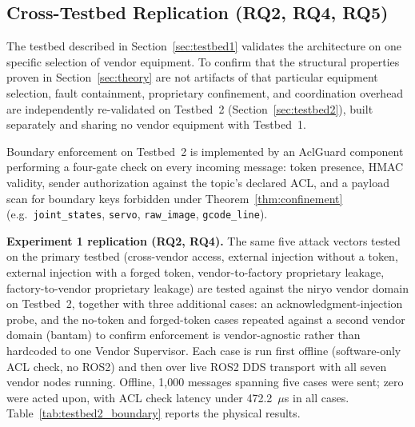 \documentclass[a4paper,fleqn]{cas-dc}
\begin{document}
\subsection{Cross-Testbed Replication (RQ2, RQ4, RQ5)}
\label{sec:replication}

The testbed described in Section~\ref{sec:testbed1} validates the architecture on one specific selection of vendor equipment. To confirm that the structural properties proven in Section~\ref{sec:theory} are not artifacts of that particular equipment selection, fault containment, proprietary confinement, and coordination overhead are independently re-validated on Testbed~2 (Section~\ref{sec:testbed2}), built separately and sharing no vendor equipment with Testbed~1.

Boundary enforcement on Testbed~2 is implemented by an AclGuard component performing a four-gate check on every incoming message: token presence, HMAC validity, sender authorization against the topic's declared ACL, and a payload scan for boundary keys forbidden under Theorem~\ref{thm:confinement} (e.g.\ \texttt{joint\_states}, \texttt{servo}, \texttt{raw\_image}, \texttt{gcode\_line}).

\textbf{Experiment 1 replication (RQ2, RQ4).} The same five attack vectors tested on the primary testbed (cross-vendor access, external injection without a token, external injection with a forged token, vendor-to-factory proprietary leakage, factory-to-vendor proprietary leakage) are tested against the niryo vendor domain on Testbed~2, together with three additional cases: an acknowledgment-injection probe, and the no-token and forged-token cases repeated against a second vendor domain (bantam) to confirm enforcement is vendor-agnostic rather than hardcoded to one Vendor Supervisor. Each case is run first offline (software-only ACL check, no ROS2) and then over live ROS2 DDS transport with all seven vendor nodes running. Offline, 1,000 messages spanning five cases were sent; zero were acted upon, with ACL check latency under 472.2~$\mu$s in all cases. Table~\ref{tab:testbed2_boundary} reports the physical results.
\end{document}
